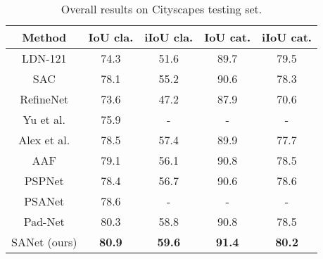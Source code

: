 \documentclass[10pt,twocolumn,twoside]{IEEEtran}
\begin{document}
\begin{table}[t]
\centering 
\caption{Overall results on Cityscapes testing set.}
\label{TB:CITYSCAPES}
\begin{tabular}{|c|cccc|}
\hline
{\bf Method}	&IoU cla. &iIoU cla. &IoU cat. &iIoU cat.  \\
\hline
LDN-121\cite{ICCV17:LADDER} &74.3 &51.6 &89.7 &79.5 \\
SAC\cite{ICCV17:SAC} &78.1 &55.2 &90.6 &78.3 \\
RefineNet\cite{CVPR17:REFINENET}	&73.6 &47.2 &87.9 &70.6   \\
Yu et al. \cite{CVPR18:DLA} &75.9 &- &- &- \\
Alex et al.\cite{CVPR18:MT}	&78.5 &57.4 &89.9 &77.7   \\
AAF \cite{ECCV18:AAF}	&79.1 &56.1 &90.8 &78.5 \\
PSPNet\cite{CVPR17:PSPNET}	&78.4 &56.7 &90.6 &78.6   \\
PSANet\cite{ECCV18:PSANET} &78.6 &- &- &- \\
Pad-Net\cite{CVPR18:PAD_NET} &80.3 &58.8 &90.8 &78.5 \\
\hline
SANet (ours)	&{\bf 80.9} &{\bf 59.6} &{\bf 91.4} &{\bf 80.2}   \\
\hline
\end{tabular}
\end{table}
\end{document}
